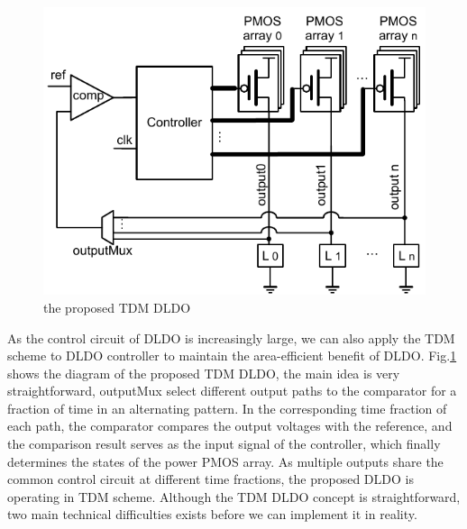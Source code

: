 \documentclass[journal]{IEEEtran}
\begin{document}
\begin{figure}[t!]
    \centering
    \includegraphics[width=\linewidth]{pic/TDM/TDMDLDO.pdf}
    \caption{the proposed TDM DLDO}
    \label{fig:TDMDLDO}
\end{figure}
As the control circuit of DLDO is increasingly large, we can also apply the TDM scheme to DLDO controller to maintain the area-efficient benefit of DLDO. Fig.\ref{fig:TDMDLDO} shows the diagram of the proposed TDM DLDO, the main idea is very straightforward, outputMux select different output paths to the comparator for a fraction of time in an alternating pattern. In the corresponding time fraction of each path, the comparator compares the output voltages with the reference, and the comparison result serves as the input signal of the controller, which finally determines the states of the power PMOS array. As multiple outputs share the common control circuit at different time fractions, the proposed DLDO is operating in TDM scheme. Although the TDM DLDO concept is straightforward, two main technical difficulties exists before we can implement it in reality.
\end{document}
